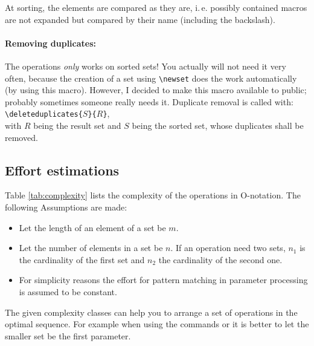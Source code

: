 At sorting, the elements are compared as they are, i.\,e. possibly contained macros are not expanded but compared by their name (including the backslash).

\paragraph{Removing duplicates:} The operations \emph{only} works on sorted sets! You actually will not need it very often, because the creation of a set using \verb|\newset| does the work automatically (by using this macro). However, I decided to make this macro available to public; probably sometimes someone really needs it.
Duplicate removal is called with:\\
\mbox{}\hspace{2em}\verb|\deleteduplicates{|$S$\verb|}{|$R$\verb|}|,\\
with $R$ being the result set and $S$ being the sorted set, whose duplicates shall be removed.

\subsection{Effort estimations}
Table \ref{tab:complexity} lists the complexity of the operations in O-notation. The following Assumptions are made:
\begin{itemize}
  \item Let the length of an element of a set be $m$.
  \item Let the number of elements in a set be $n$. If an operation need two sets, $n_1$ is the cardinality of the first set and $n_2$ the cardinality of the second one.
  \item For simplicity reasons the effort for pattern matching in parameter processing is assumed to be constant.
\end{itemize}

The given complexity classes can help you to arrange a set of operations in the optimal sequence. For example when using the commands \verb@\intersectsets@ or \verb@\minussets@ it is better to let the smaller set be the first parameter.

